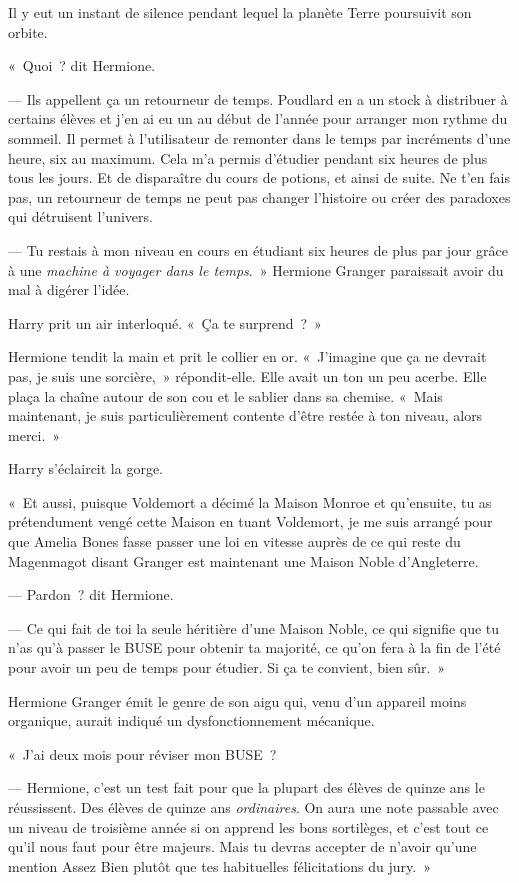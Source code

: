 Il y eut un instant de silence pendant lequel la planète Terre poursuivit son orbite.

«~Quoi~? dit Hermione.

--- Ils appellent ça un retourneur de temps.
Poudlard en a un stock à distribuer à certains élèves et j'en ai eu un au début de l'année pour arranger mon rythme du sommeil.
Il permet à l'utilisateur de remonter dans le temps par incréments d'une heure, six au maximum.
Cela m'a permis d'étudier pendant six heures de plus tous les jours.
Et de disparaître du cours de potions, et ainsi de suite.
Ne t'en fais pas, un retourneur de temps ne peut pas changer l'histoire ou créer des paradoxes qui détruisent l'univers.

--- Tu restais à mon niveau en cours en étudiant six heures de plus par jour grâce à une \emph{machine à voyager dans le temps}.~»
Hermione Granger paraissait avoir du mal à digérer l'idée.

Harry prit un air interloqué.
«~Ça te surprend~?~»

Hermione tendit la main et prit le collier en or.
«~J'imagine que ça ne devrait pas, je suis une sorcière,~» répondit-elle.
Elle avait un ton un peu acerbe.
Elle plaça la chaîne autour de son cou et le sablier dans sa chemise.
«~Mais maintenant, je suis particulièrement contente d'être restée à ton niveau, alors merci.~»

Harry s'éclaircit la gorge.

«~Et aussi, puisque Voldemort a décimé la Maison Monroe et qu'ensuite, tu as prétendument vengé cette Maison en tuant Voldemort, je me suis arrangé pour que Amelia Bones fasse passer une loi en vitesse auprès de ce qui reste du Magenmagot disant Granger est maintenant une Maison Noble d'Angleterre.

--- Pardon~? dit Hermione.

--- Ce qui fait de toi la seule héritière d'une Maison Noble, ce qui signifie que tu n'as qu'à passer le BUSE pour obtenir ta majorité, ce qu'on fera à la fin de l'été pour avoir un peu de temps pour étudier.
Si ça te convient, bien sûr.~»

Hermione Granger émit le genre de son aigu qui, venu d'un appareil moins organique, aurait indiqué un dysfonctionnement mécanique.

«~J'ai deux mois pour réviser mon BUSE~?

--- Hermione, c'est un test fait pour que la plupart des élèves de quinze ans le réussissent.
Des élèves de quinze ans \emph{ordinaires}.
On aura une note passable avec un niveau de troisième année si on apprend les bons sortilèges, et c'est tout ce qu'il nous faut pour être majeurs.
Mais tu devras accepter de n'avoir qu'une mention Assez Bien plutôt que tes habituelles félicitations du jury.~»

